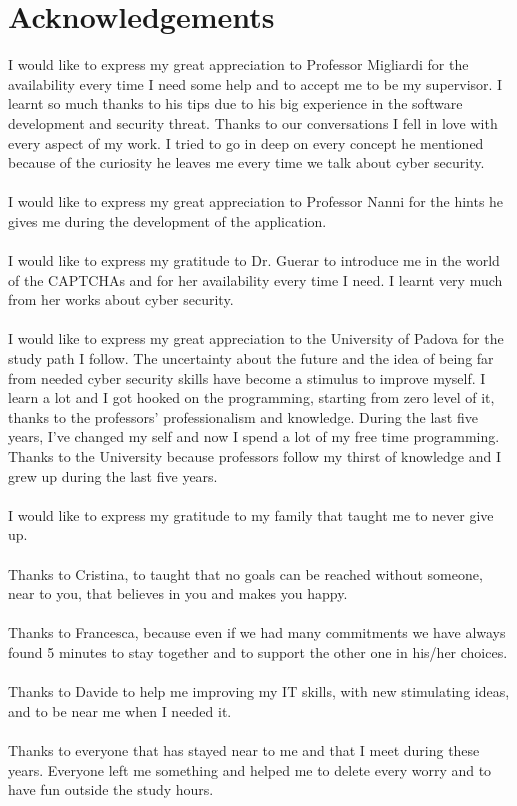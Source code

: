 \chapter*{Acknowledgements}
\renewcommand\chaptermark[1]{\markboth{\uppercase{#1}}{}}
\chaptermark{Acknowledgments}
I would like to express my great appreciation to Professor Migliardi for the availability every time I need some help and to accept me to be my supervisor. I learnt so much thanks to his tips due to his big experience in the software development and security threat. Thanks to our conversations I fell in love with every aspect of my work. I tried to go in deep on every concept he mentioned because of the curiosity he leaves me every time we talk about cyber security.\\\\
I would like to express my great appreciation to Professor Nanni for the hints he gives me during the development of the application.\\\\
I would like to express my gratitude to Dr. Guerar to introduce me in the world of the CAPTCHAs and for her availability every time I need. I learnt very much from her works about cyber security.\\\\
I would like to express my great appreciation to the University of Padova for the study path I follow. The uncertainty about the future and the idea of being far from needed cyber security skills have become a stimulus to improve myself. I learn a lot and I got hooked on the programming, starting from zero level of it, thanks to the professors' professionalism and knowledge. During the last five years, I've changed my self and now I spend a lot of my free time programming. Thanks to the University because professors follow my thirst of knowledge and I grew up during the last five years.\\\\
I would like to express my gratitude to my family that taught me to never give up.\\\\
Thanks to Cristina, to taught that no goals can be reached without someone, near to you, that believes in you and makes you happy.\\\\
Thanks to Francesca, because even if we had many commitments we have always found 5 minutes to stay together and to support the other one in his/her choices.\\\\
Thanks to Davide to help me improving my IT skills, with new stimulating ideas, and to be near me when I needed it.\\\\
Thanks to everyone that has stayed near to me and that I meet during these years. Everyone left me something and helped me to delete every worry and to have fun outside the study hours.\\\\